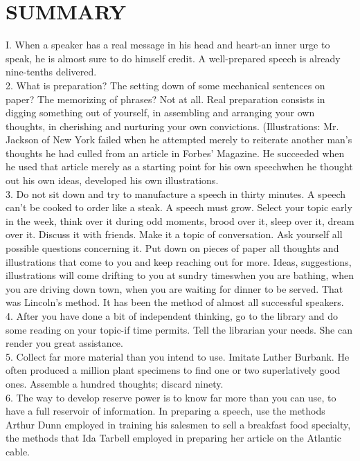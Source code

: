 \documentclass[10pt]{article}
\begin{document}
\section*{SUMMARY}
I. When a speaker has a real message in his head and heart-an inner urge to speak, he is almost sure to do himself credit. A well-prepared speech is already nine-tenths delivered.\\
2. What is preparation? The setting down of some mechanical sentences on paper? The memorizing of phrases? Not at all. Real preparation consists in digging something out of yourself, in assembling and arranging your own thoughts, in cherishing and nurturing your own convictions. (Illustrations: Mr. Jackson of New York failed when he attempted merely to reiterate another man's thoughts he had culled from an article in Forbes' Magazine. He succeeded when he used that article merely as a starting point for his own speechwhen he thought out his own ideas, developed his own illustrations.\\
3. Do not sit down and try to manufacture a speech in thirty minutes. A speech can't be cooked to order like a steak. A speech must grow. Select your topic early in the week, think over it during odd moments, brood over it, sleep over it, dream over it. Discuss it with friends. Make it a topic of conversation. Ask yourself all possible questions concerning it. Put down on pieces of paper all thoughts and illustrations that come to you and keep reaching out for more. Ideas, suggestions, illustrations will come drifting to you at sundry timeswhen you are bathing, when you are driving down town, when you are waiting for dinner to be served. That was Lincoln's method. It has been the method of almost all successful speakers.\\
4. After you have done a bit of independent thinking, go to the library and do some reading on your topic-if time permits. Tell the librarian your needs. She can render you great assistance.\\
5. Collect far more material than you intend to use. Imitate Luther Burbank. He often produced a million plant specimens to find one or two superlatively good ones. Assemble a hundred thoughts; discard ninety.\\
6. The way to develop reserve power is to know far more than you can use, to have a full reservoir of information. In preparing a speech, use the methods Arthur Dunn employed in training his salesmen to sell a breakfast food specialty, the methods that Ida Tarbell employed in preparing her article on the Atlantic cable.
\end{document}
